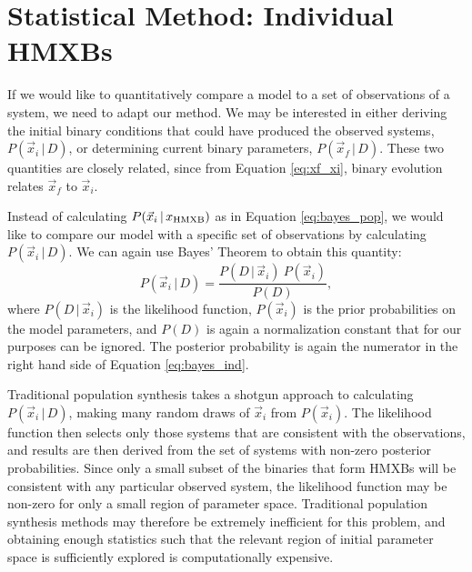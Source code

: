 \documentclass[usenatbib]{mnras}
\newcommand{\given}{\,|\,}
\begin{document}
\section{Statistical Method: Individual HMXBs} \label{sec:stats_individual}

If we would like to quantitatively compare a model to a set of observations of a system, we need to adapt our method. We may be interested in either deriving the initial binary conditions that could have produced the observed systems, $P(\vec{x}_i \given D)$, or determining current binary parameters, $P(\vec{x}_f \given D)$. These two quantities are closely related, since from Equation \ref{eq:xf_xi}, binary evolution relates $\vec{x}_f$ to $\vec{x}_i$. 




Instead of calculating $P(\vec{x}_i \given x_{\rm HMXB})$ as in Equation \ref{eq:bayes_pop}, we would like to compare our model with a specific set of observations by calculating $P(\vec{x}_i \given D)$. We can again use Bayes' Theorem to obtain this quantity:
\begin{equation}
P(\vec{x}_i \given D) = \frac{P(D \given \vec{x}_i)\ P(\vec{x}_i)}{P(D)}, \label{eq:bayes_ind}
\end{equation}
where $P(D \given \vec{x}_i)$ is the likelihood function, $P(\vec{x}_i)$ is the prior probabilities on the model parameters, and $P(D)$ is again a normalization constant that for our purposes can be ignored. The posterior probability is again the numerator in the right hand side of Equation \ref{eq:bayes_ind}.

Traditional population synthesis takes a shotgun approach to calculating $P(\vec{x}_i \given D)$, making many random draws of $\vec{x}_i$ from $P(\vec{x}_i)$. The likelihood function then selects only those systems that are consistent with the observations, and results are then derived from the set of systems with non-zero posterior probabilities. Since only a small subset of the binaries that form HMXBs will be consistent with any particular observed system, the likelihood function may be non-zero for only a small region of parameter space. Traditional population synthesis methods may therefore be extremely inefficient for this problem, and obtaining enough statistics such that the relevant region of initial parameter space is sufficiently explored is computationally expensive.
\end{document}
